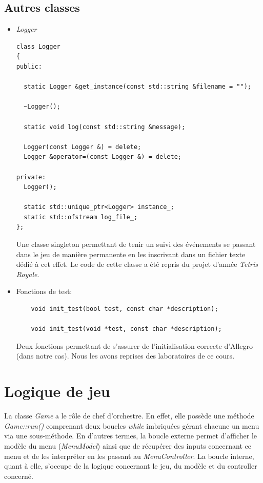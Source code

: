 \documentclass[utf8]{article}
\begin{document}
\subsection{Autres classes}

\begin{itemize}
    \item \emph{Logger}
    \begin{verbatim}
class Logger
{
public:

  static Logger &get_instance(const std::string &filename = "");

  ~Logger();

  static void log(const std::string &message);

  Logger(const Logger &) = delete;
  Logger &operator=(const Logger &) = delete;

private:
  Logger();

  static std::unique_ptr<Logger> instance_;
  static std::ofstream log_file_;
};
    \end{verbatim}
    Une classe singleton permettant de tenir un suivi des événements se passant dans le jeu de manière permanente en les inscrivant dans un fichier texte dédié à cet effet.
    Le code de cette classe a été repris du projet d'année \emph{Tetris Royale}. \\

    \item Fonctions de test:
    \begin{verbatim}
    void init_test(bool test, const char *description);
        
    void init_test(void *test, const char *description);
    \end{verbatim}
    Deux fonctions permettant de s'assurer de l'initialisation correcte d'Allegro (dans notre cas). Nous les avons reprises des laboratoires de ce cours.
\end{itemize}

\section{Logique de jeu}
La classe \emph{Game} a le rôle de chef d'orchestre. En effet, elle possède une méthode \emph{Game::run()} comprenant deux boucles \emph{while} imbriquées gérant chacune un menu via une sous-méthode. En d'autres termes, la boucle externe permet d'afficher le modèle du menu (\emph{MenuModel}) ainsi que de récupérer des inputs concernant ce menu et de les interpréter en les passant au \emph{MenuController}. La boucle interne, quant à elle, s'occupe de la logique concernant le jeu, du modèle et du controller concerné. 
\end{document}
